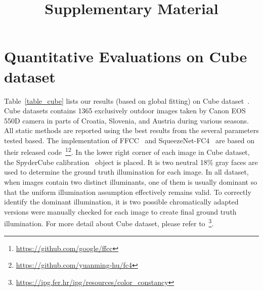 \documentclass[10pt,twocolumn,letterpaper]{article}
\begin{document}
\title{Supplementary Material}
\maketitle


\section{Quantitative Evaluations on Cube dataset}

Table~\ref{table_cube} lists our results (based on global fitting) on Cube dataset~\cite{DBLP:journals/corr/abs-1712-00436}.
Cube datasets contains 1365 exclusively outdoor images taken by Canon EOS 550D camera in
parts of Croatia, Slovenia, and Austria during various seasons.
All static methods are reported using the best results from the several parameters tested based.
The implementation of FFCC~\cite{DBLP:journals/corr/BarronT16} and SqueezeNet-FC4~\cite{hu2017fc}
are based on their released code~\footnote{\href{url}{https://github.com/google/ffcc}}\footnote{\href{url}{https://github.com/yuanming-hu/fc4}}.
In the lower right corner of each image in Cube dataset,
the SpyderCube calibration~\cite{DBLP:journals/corr/abs-1712-00436} object is placed.
It is two neutral 18\% gray faces are used to determine the ground truth illumination for each image.
In all dataset, when images contain two distinct illuminants,
one of them is usually dominant so that the uniform illumination assumption effectively remains valid.
To correctly identify the dominant illumination, it is two possible chromatically adapted versions were manually checked for each image
to create final ground truth illumination.
For more detail about Cube dataset, please refer to~\footnote{\href{url}{https://ipg.fer.hr/ipg/resources/color\_constancy}}.
\end{document}
